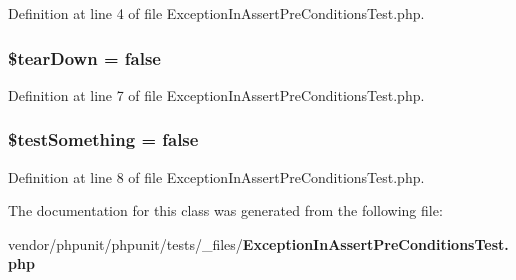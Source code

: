 Definition at line 4 of file Exception\+In\+Assert\+Pre\+Conditions\+Test.\+php.

\subsubsection[{\$tear\+Down}]{\setlength{\rightskip}{0pt plus 5cm}\${\bf tear\+Down} = false}\label{class_exception_in_assert_pre_conditions_test_a9639b8e6f680299142ffe313f876712f}


Definition at line 7 of file Exception\+In\+Assert\+Pre\+Conditions\+Test.\+php.

\subsubsection[{\$test\+Something}]{\setlength{\rightskip}{0pt plus 5cm}\${\bf test\+Something} = false}\label{class_exception_in_assert_pre_conditions_test_a25acbdb5bf8dc30b31f537d60bfb02f5}


Definition at line 8 of file Exception\+In\+Assert\+Pre\+Conditions\+Test.\+php.



The documentation for this class was generated from the following file\+:\begin{DoxyCompactItemize}
\item 
vendor/phpunit/phpunit/tests/\+\_\+files/{\bf Exception\+In\+Assert\+Pre\+Conditions\+Test.\+php}\end{DoxyCompactItemize}
